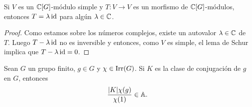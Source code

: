 \begin{lemma}
    Si $V$ es un $\mathbb{C}[G]$-módulo simple y $T\colon V\to V$ es un morfismo de $\mathbb{C}[G]$-módulos, entonces
    $T=\lambda\operatorname{id}$ para algún $\lambda\in\mathbb{C}$. 
\end{lemma}

\begin{proof}
    Como estamos sobre los números complejos, existe un autovalor 
    $\lambda\in\mathbb{C}$ de $T$. Luego $T-\lambda\operatorname{id}$ no es inversible y entonces, 
    como $V$ es simple, el lema de Schur implica que $T-\lambda\operatorname{id}=0$. 
\end{proof}

\begin{theorem}
  \label{theorem:algebraic}
  Sean $G$ un grupo finito, $g\in G$ y $\chi\in\operatorname{Irr}(G)$. Si $K$ es la clase de
  conjugación de $g$ en $G$, entonces
  \[
    \frac{|K|\chi(g)}{\chi(1)}\in\mathbb{A}.
  \]
\end{theorem}

